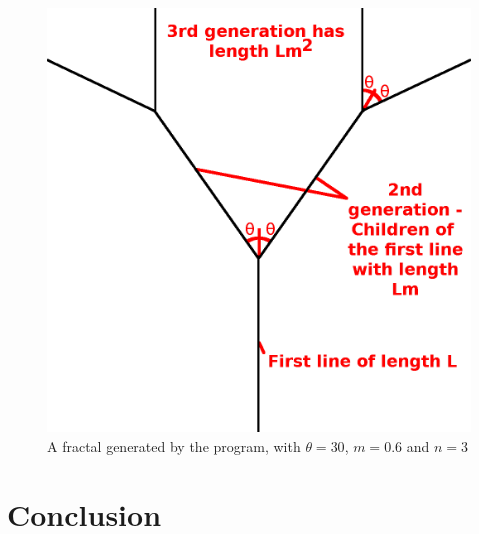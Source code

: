 \documentclass[11pt]{article}
\begin{document}
\begin{figure}[t]
	\label{general explanation}
	\includegraphics[width=\linewidth]{Images/GeneralExplanation.png}
	\centering
	\caption{A fractal generated by the program, with $\theta=30$, $m=0.6$ and $n=3$}
\end{figure}





\section{Conclusion}

\pagebreak




\pagebreak

%
\end{document}
